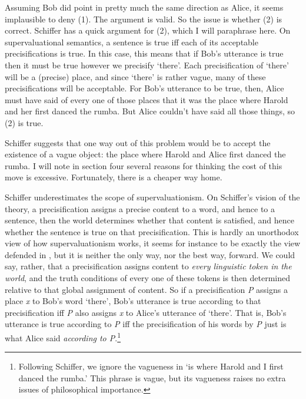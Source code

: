 \noindent Assuming Bob did point in pretty much the same direction as Alice, it seems implausible to deny (1). The argument is valid. So the issue is whether (2) is correct. Schiffer has a quick argument for (2), which I will paraphrase here. On supervaluational semantics, a sentence is true iff each of its acceptable precisifications is true. In this case, this means that if Bob's utterance is true then it must be true however we precisify `there'. Each precisification of `there' will be a (precise) place, and since `there' is rather vague, many of these precisifications will be acceptable. For Bob's utterance to be true, then, Alice must have said of every one of those places that it was the place where Harold and her first danced the rumba. But Alice couldn't have said all those things, so (2) is true.

Schiffer suggests that one way out of this problem would be to accept the existence of a vague object: the place where Harold and Alice first danced the rumba. I will note in section four several reasons for thinking the cost of this move is excessive. Fortunately, there is a cheaper way home.

Schiffer underestimates the scope of supervaluationism. On Schiffer's vision of the theory, a precisification assigns a precise content to a word, and hence to a sentence, then the world determines whether that content is satisfied, and hence whether the sentence is true on that precisification. This is hardly an unorthodox view of how supervaluationism works, it seems for instance to be exactly the view defended in \citet{Keefe2000}, but it is neither the only way, nor the best way, forward. We could say, rather, that a precisification assigns content to \textit{every linguistic token in the world}, and the truth conditions of every one of these tokens is then determined relative to that global assignment of content. So if a precisification \textit{P} assigns a place \textit{x} to Bob's word `there', Bob's utterance is true according to that precisification iff \textit{P} also assigns \textit{x} to Alice's utterance of `there'. That is, Bob's utterance is true according to \textit{P} iff the precisification of his words by \textit{P} just is what Alice said \textit{according to P}.\footnote{Following Schiffer, we ignore the vagueness in `is where Harold and I first danced the rumba.' This phrase is vague, but its vagueness raises no extra issues of philosophical importance.}

